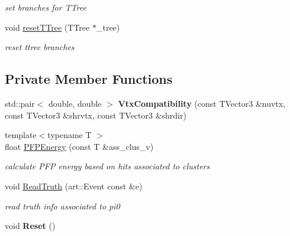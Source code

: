 \begin{DoxyCompactItemize}
\begin{DoxyCompactList}\small\item\em set branches for T\+Tree \end{DoxyCompactList}\item 
void \hyperlink{classanalysis_1_1Pi0Tagger_af4f17e7d84f5a62fd4c3f1a85ff7c73d}{reset\+T\+Tree} (T\+Tree $\ast$\+\_\+tree)\hypertarget{classanalysis_1_1Pi0Tagger_af4f17e7d84f5a62fd4c3f1a85ff7c73d}{}\label{classanalysis_1_1Pi0Tagger_af4f17e7d84f5a62fd4c3f1a85ff7c73d}

\begin{DoxyCompactList}\small\item\em reset ttree branches \end{DoxyCompactList}\end{DoxyCompactItemize}
\subsection*{Private Member Functions}
\begin{DoxyCompactItemize}
\item 
std\+::pair$<$ double, double $>$ {\bfseries Vtx\+Compatibility} (const T\+Vector3 \&nuvtx, const T\+Vector3 \&shrvtx, const T\+Vector3 \&shrdir)\hypertarget{classanalysis_1_1Pi0Tagger_a9578654c18acbe3b04243fa1515c4157}{}\label{classanalysis_1_1Pi0Tagger_a9578654c18acbe3b04243fa1515c4157}

\item 
{\footnotesize template$<$typename T $>$ }\\float \hyperlink{classanalysis_1_1Pi0Tagger_a76d170d7d7059d3b2d09bf94309d4b30}{P\+F\+P\+Energy} (const T \&ass\+\_\+clus\+\_\+v)\hypertarget{classanalysis_1_1Pi0Tagger_a76d170d7d7059d3b2d09bf94309d4b30}{}\label{classanalysis_1_1Pi0Tagger_a76d170d7d7059d3b2d09bf94309d4b30}

\begin{DoxyCompactList}\small\item\em calculate P\+FP energy based on hits associated to clusters \end{DoxyCompactList}\item 
void \hyperlink{classanalysis_1_1Pi0Tagger_a11bc949d14b020473a18f4bbf11cd0be}{Read\+Truth} (art\+::\+Event const \&e)\hypertarget{classanalysis_1_1Pi0Tagger_a11bc949d14b020473a18f4bbf11cd0be}{}\label{classanalysis_1_1Pi0Tagger_a11bc949d14b020473a18f4bbf11cd0be}

\begin{DoxyCompactList}\small\item\em read truth info associated to pi0 \end{DoxyCompactList}\item 
void {\bfseries Reset} ()\hypertarget{classanalysis_1_1Pi0Tagger_a42d30772bb653fa65250a195f79b3361}{}\label{classanalysis_1_1Pi0Tagger_a42d30772bb653fa65250a195f79b3361}

\end{DoxyCompactItemize}
